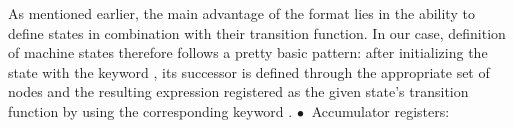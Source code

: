 \noindent
As mentioned earlier, the main advantage of the {\BTOR} format lies in the ability to define states in combination with their transition function.
In our case, definition of machine states therefore follows a pretty basic pattern:
after initializing the state with the keyword ,
its successor is defined through the appropriate set of nodes and
the resulting expression
registered as the given state's transition function by using the corresponding keyword .
\bigbreak
\noindent
$\bullet\ $ Accumulator registers:
